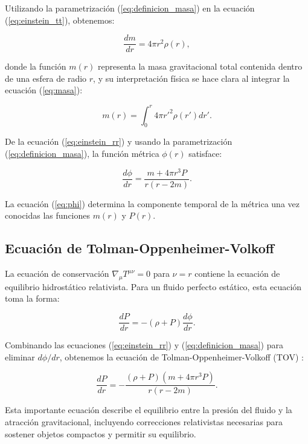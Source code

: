 Utilizando la parametrización (\ref{eq:definicion_masa}) en la ecuación (\ref{eq:einstein_tt}), obtenemos:

\begin{equation}
	\frac{dm}{dr} = 4\pi r^2 \rho(r),
	\label{eq:masa}
\end{equation}

donde la función $m(r)$ representa la masa gravitacional total contenida dentro de una esfera de radio $r$, y su interpretación física se hace clara al integrar la ecuación (\ref{eq:masa}):

\begin{equation}
	m(r) = \int_0^r 4\pi r'^2 \rho(r') dr'.
\end{equation}

De la ecuación (\ref{eq:einstein_rr}) y usando la parametrización (\ref{eq:definicion_masa}), la función métrica $\phi(r)$ satisface:

\begin{equation}
	\frac{d\phi}{dr} = \frac{m + 4\pi r^3 P}{r(r - 2m)}.
	\label{eq:phi}
\end{equation}

La ecuación (\ref{eq:phi}) determina la componente temporal de la métrica una vez conocidas las funciones $m(r)$ y $P(r)$.

\subsection{Ecuación de Tolman-Oppenheimer-Volkoff}

La ecuación de conservación $\nabla_\mu T^{\mu\nu} = 0$ para $\nu = r$ contiene la ecuación de equilibrio hidrostático relativista. Para un fluido perfecto estático, esta ecuación toma la forma:

\begin{equation}
	\frac{dP}{dr} = -(\rho + P)\frac{d\phi}{dr}.
\end{equation}

Combinando las ecuaciones (\ref{eq:einstein_rr}) y (\ref{eq:definicion_masa}) para eliminar $d\phi/dr$, obtenemos la ecuación de Tolman-Oppenheimer-Volkoff (TOV) \cite{oppenheimerMassiveNeutronCores1939}:

\begin{equation}
	\frac{dP}{dr} = -\frac{(\rho + P)(m + 4\pi r^3 P)}{r(r - 2m)}.
	\label{eq:tov}
\end{equation}

Esta importante ecuación describe el equilibrio entre la presión del fluido y la atracción gravitacional, incluyendo correcciones relativistas necesarias para sostener objetos compactos \cite{oppenheimerMassiveNeutronCores1939} y permitir su equilibrio.

